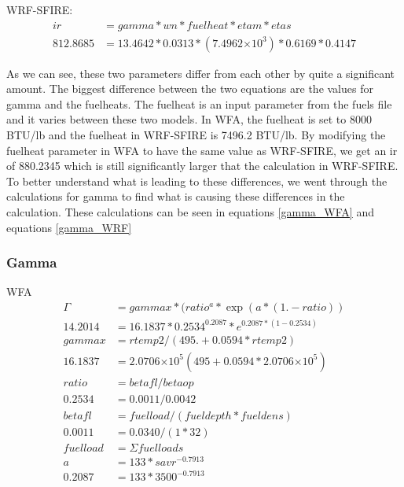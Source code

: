\documentclass{article}
\newcommand\tenpow[1]{\ensuremath{{\times}10^{#1}}}
\begin{document}
WRF-SFIRE:
\begin{equation}
\label{IR_WRF_2}
	\begin{split}
		ir       &= gamma * wn * fuelheat * etam * etas \\
		812.8685 &= 13.4642 * 0.0313 * (7.4962 \tenpow{3}) * 0.6169 * 0.4147
	\end{split}
\end{equation}


As we can see, these two parameters differ from each other by quite a significant amount. The biggest difference between the two equations are the values for gamma and the fuelheats. The fuelheat is an input parameter from the fuels file and it varies between these two models. In WFA, the fuelheat is set to 8000 BTU/lb and the fuelheat in WRF-SFIRE is 7496.2 BTU/lb. By modifying the fuelheat parameter in WFA to have the same value as WRF-SFIRE, we get an ir of 880.2345 which is still significantly larger that the calculation in WRF-SFIRE. To better understand what is leading to these differences, we went through the calculations for gamma to find what is causing these differences in the calculation. These calculations can be seen in equations \ref{gamma_WFA} and equations \ref{gamma_WRF}
\subsubsection{Gamma}


WFA
\begin{equation}
	\label{gamma_WFA}
	\begin{split}
		\Gamma &= gammax*(ratio^a * \exp(a*(1.-ratio)) \\
		14.2014 &= 16.1837 * 0.2534 ^ {0.2087} * e^{0.2087 * (1 - 0.2534)} \\
		gammax &= rtemp2/(495. + 0.0594*rtemp2) \\
		16.1837 &= 2.0706\tenpow{5} (495 + 0.0594* 2.0706\tenpow{5}) \\
		ratio &= betafl/betaop \\
		0.2534 &= 0.0011 / 0.0042 \\
		betafl &= fuelload/(fueldepth * fueldens) \\
		0.0011 &= 0.0340 / (1 * 32) \\
		fuelload &= \Sigma fuelloads \\ 
	    a &= 133 * savr ^ {-0.7913} \\
		0.2087 &= 133 * 3500^{-0.7913} 
	\end{split}
\end{equation}
\end{document}
